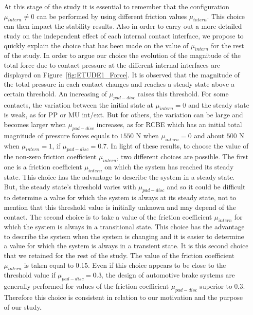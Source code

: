 \documentclass[final,1p]{elsarticle}
\begin{document}
At this stage of the study it is essential to remember that the configuration $\mu_{intern} \neq 0$ can be performed by using different friction values $\mu_{intern}$. This choice can then impact the stability results. Also in order to carry out a more detailed study on the independent effect of each internal contact interface, we propose to  quickly explain the choice that has been made on the value of $\mu_{intern}$ for the rest of the study. In order to argue our choice the evolution of the magnitude of the total force due to contact pressure at the different internal interfaces are displayed on Figure~\ref{fig:ETUDE1_Force}. It is observed that the magnitude of the total pressure in each contact changes and reaches a steady state above a certain threshold. An increasing of $\mu_{pad-disc}$ raises this threshold. For some contacts, the variation between the initial state at $\mu_{intern} = 0$ and the steady state is weak, as for PP or MU int/ext. But for others, the variation can be large and becomes larger when $\mu_{pad-disc}$ increases, as for RCBE which has an initial total magnitude of pressure forces equals to $1550$ N when $\mu_{intern} =0$ and about $500$ N when $\mu_{intern}=1$, if $\mu_{pad-disc}=0.7$. In light of these results, to choose the value of the non-zero friction coefficient $\mu_{intern}$, two different choices are possible. The first one is a friction coefficient $\mu_{intern}$ on which the system has reached its steady state. This choice has the advantage to describe the system in a steady state. But, the steady state's threshold varies with $\mu_{pad-disc}$  and so it could be difficult to determine a value for which the system is always at its steady state, not to mention that this threshold value is initially unknown and may depend of the contact. The second choice is to take a value of the friction coefficient $\mu_{intern}$ for which the system is always in a transitional state. This choice has the advantage to describe the system when the system is changing and it is easier to determine a value for which the system is always in a transient state. It is this second choice that we retained for the rest of the study. The value of the friction coefficient $\mu_{intern}$ is taken equal to $0.15$. Even if this choice appears to be close to the threshold value if $\mu_{pad-disc}=0.3$, the design of automotive brake systems are generally performed for values of the friction coefficient $\mu_{pad-disc}$ superior to $0.3$. Therefore this choice is consistent in relation to our motivation and the purpose of our study.
\end{document}
